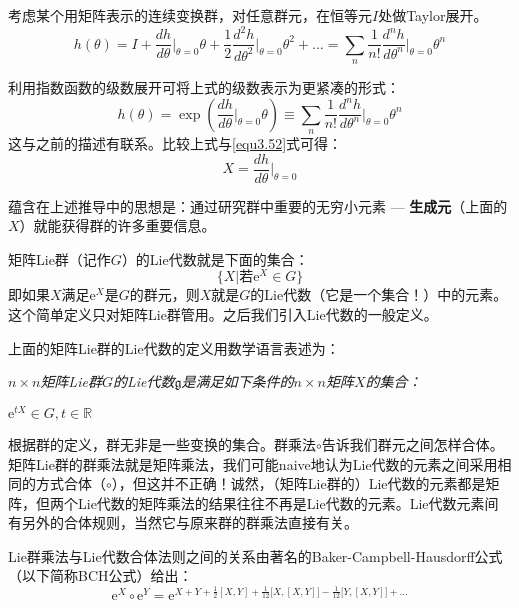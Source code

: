 考虑某个用矩阵表示的连续变换群，对任意群元，在恒等元$I$处做Taylor展开。
\begin{equation}
\label{equ3.53}
h(\theta) = I + \frac{dh}{d\theta} \Bigg|_{\theta = 0} \theta + \frac{1}{2} \frac{d^2 h}{d \theta^2} \Bigg|_{\theta = 0} \theta^2 + \dots = \sum_n \frac{1}{n!} \frac{d^n h}{d \theta^n} \Bigg|_{\theta = 0} \theta^n
\end{equation}

利用指数函数的级数展开可将上式的级数表示为更紧凑的形式：
\begin{equation}
\label{equ3.54}
h(\theta) = \exp \left( \frac{dh}{d\theta}\Big|_{\theta = 0} \theta \right) \equiv \sum_n \frac{1}{n!} \frac{d^n h}{d \theta^n}\Bigg|_{\theta = 0} \theta^n
\end{equation}
这与之前的描述有联系。比较上式与\ref{equ3.52}式可得：
\begin{equation}
\label{equ3.55}
X = \frac{dh}{d\theta}\Bigg|_{\theta = 0}
\end{equation}

蕴含在上述推导中的思想是：通过研究群中重要的无穷小元素 --- {\bf 生成元}（上面的$X$）就能获得群的许多重要信息。

矩阵Lie群（记作$G$）的Lie代数就是下面的集合：
\[ 
\Big\{X \Big| \text{若}\mathrm{e}^X \in G \Big\}
\]
即如果$X$满足$\mathrm{e}^X$是$G$的群元，则$X$就是$G$的Lie代数（它是一个集合！）中的元素。这个简单定义只对矩阵Lie群管用。之后我们引入Lie代数的一般定义。

上面的矩阵Lie群的Lie代数的定义用数学语言表述为：

{ \it
$n \times n$矩阵Lie群$G$的Lie代数$\mathfrak{g}$是满足如下条件的$n \times n$矩阵$X$的集合：

	{\begin{center}
		$\mathrm{e}^{tX} \in G, t \in \mathbb{R}$
	\end{center}
	}
}

根据群的定义，群无非是一些变换的集合。群乘法$\circ$告诉我们群元之间怎样合体。矩阵Lie群的群乘法就是矩阵乘法，我们可能naive地认为Lie代数的元素之间采用相同的方式合体（$\circ$），但这并不正确！诚然，（矩阵Lie群的）Lie代数的元素都是矩阵，但两个Lie代数的矩阵乘法的结果往往不再是Lie代数的元素。Lie代数元素间有另外的合体规则，当然它与原来群的群乘法直接有关。

Lie群乘法与Lie代数合体法则之间的关系由著名的Baker-Campbell-Hausdorff公式（以下简称BCH公式）给出：
\begin{equation}
\label{equ3.56}
\mathrm{e}^X \circ \mathrm{e}^Y = \mathrm{e}^{X + Y + \frac{1}{2}[X, Y] + \frac{1}{12} \big[X, [X, Y]\big] - \frac{1}{12} \big[Y, [X, Y]\big] + \dots  }
\end{equation}
